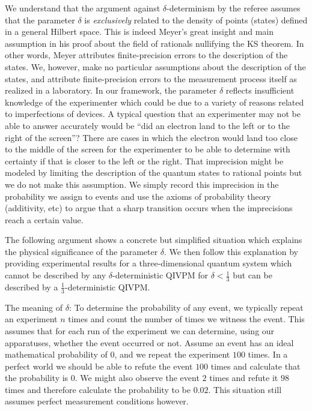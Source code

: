 \documentclass[english,reprint, aps, prl,superscriptaddress, showpacs,
showkeys, longbibliography, amsmath, amssymb, floatfix]{revtex4-1}
\theoremstyle{plain}
\theoremstyle{definition}
\begin{document}
We understand that the argument against $\delta$-determinism by the
referee assumes that the parameter $\delta$ is \emph{exclusively}
related to the density of points (states) defined in a general Hilbert
space. This is indeed Meyer's great insight and main assumption in
his proof about the field of rationals nullifying the KS theorem.
In other words, Meyer attributes finite-precision errors to the description
of the states. We, however, make no particular assumptions about the
description of the states, and attribute finite-precision errors to
the measurement process itself as realized in a laboratory. In our
framework, the parameter $\delta$ reflects insufficient knowledge
of the experimenter which could be due to a variety of reasons related
to imperfections of devices. A typical question that an experimenter
may not be able to answer accurately would be ``did an electron land
to the left or to the right of the screen''? There are cases in which
the electron would land too close to the middle of the screen for
the experimenter to be able to determine with certainty if that is
closer to the left or the right. That imprecision might be modeled
by limiting the description of the quantum states to rational points
but we do not make this assumption. We simply record this imprecision
in the probability we assign to events and use the axioms of probability
theory (additivity, etc) to argue that a sharp transition occurs when
the imprecisions reach a certain value. 

The following argument shows a concrete but simplified situation which
explains the physical significance of the parameter $\delta$. We
then follow this explanation by providing experimental results for
a three-dimensional quantum system which cannot be described by any
$\delta$-deterministic QIVPM for $\delta<\frac{1}{3}$ but can be
described by a $\frac{1}{3}$-deterministic QIVPM.

The meaning of $\delta$: To determine the probability of any event,
we typically repeat an experiment $n$ times and count the number
of times we witness the event. This assumes that for each run of the
experiment we can determine, using our apparatuses, whether the event
occurred or not. Assume an event has an ideal mathematical probability
of $0$, and we repeat the experiment $100$ times. In a perfect world
we should be able to refute the event $100$ times and calculate that
the probability is $0$. We might also observe the event $2$ times
and refute it $98$ times and therefore calculate the probability
to be $0.02$. This situation still assumes perfect measurement conditions
however. 
\end{document}
